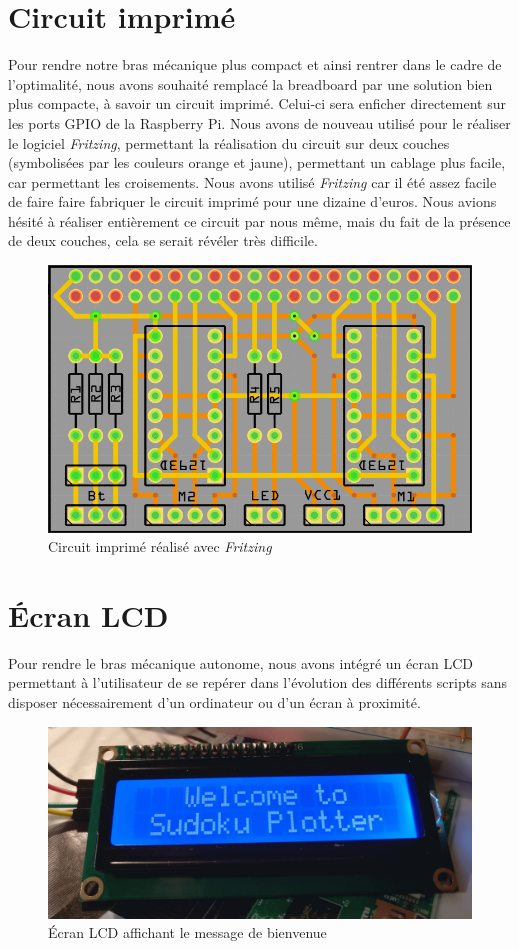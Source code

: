 \documentclass[12pt,a4paper]{report}
\begin{document}
\section{Circuit imprimé}
Pour rendre notre bras mécanique plus compact et ainsi rentrer dans le cadre de l'optimalité, nous avons souhaité remplacé la breadboard par une solution bien plus compacte, à savoir un circuit imprimé. Celui-ci sera enficher directement sur les ports GPIO de la Raspberry Pi. Nous avons de nouveau utilisé pour le réaliser le logiciel \emph{Fritzing}, permettant la réalisation du circuit sur deux couches (symbolisées par les couleurs orange et jaune), permettant un cablage plus facile, car permettant les croisements. Nous avons utilisé \emph{Fritzing} car il été assez facile de faire faire fabriquer le circuit imprimé pour une dizaine d'euros. Nous avions hésité à réaliser entièrement ce circuit par nous même, mais du fait de la présence de deux couches, cela se serait révéler très difficile.

\begin{figure}[!h]
 \center
 \includegraphics[scale=0.5]{../pictures/Sudoku_circuit_imprime.png}
 \caption{Circuit imprimé réalisé avec \emph{Fritzing}}
\end{figure}

\section{Écran LCD}
Pour rendre le bras mécanique autonome, nous avons intégré un écran LCD permettant à l'utilisateur de se repérer dans l'évolution des différents scripts sans disposer nécessairement d'un ordinateur ou d'un écran à proximité.
\begin{figure}[!h]
 \center
 \includegraphics[scale=0.3]{../pictures/ecran_lcd}
 \caption{\'{E}cran LCD affichant le message de bienvenue}
\end{figure}
\end{document}
